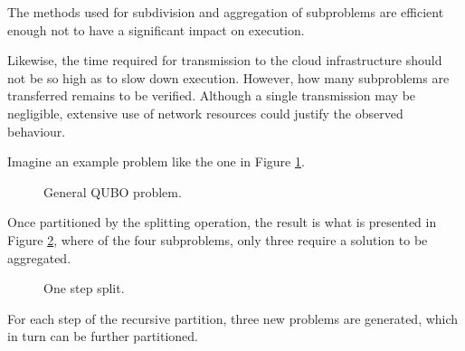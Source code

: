 The methods used for subdivision and aggregation of subproblems are efficient enough not to have a significant impact on execution.

Likewise, the time required for transmission to the cloud infrastructure should not be so high as to slow down execution. 
However, how many subproblems are transferred remains to be verified. 
Although a single transmission may be negligible, extensive use of network resources could justify the observed behaviour.

Imagine an example problem like the one in Figure \ref{fig:exstart}.

\begin{figure}[H]
    \centering
    \caption{General QUBO problem.}
    \label{fig:exstart}
\end{figure}

Once partitioned by the splitting operation, the result is what is presented in Figure \ref{fig:exsplit}, where of the four subproblems, only three require a solution to be aggregated.

\begin{figure}[H]
    \centering
    \caption{One step split.}
    \label{fig:exsplit}
\end{figure}

For each step of the recursive partition, three new problems are generated, which in turn can be further partitioned.

